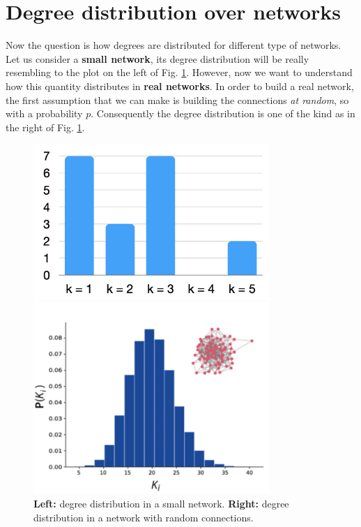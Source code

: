 \documentclass[../main/main.tex]{subfiles}
\begin{document}
\section{Degree distribution over networks}
Now the question is how degrees are distributed for different type of networks.\\
Let us consider a \textbf{small network}, its degree distribution will be really resembling to the plot on the left of Fig. \ref{fig:06_2}. However, now we want to understand how this quantity distributes in \textbf{real networks}. In order to build a real network, the first assumption that we can make is building the connections \textit{at random}, so with a probability $p$. Consequently the degree distribution is one of the kind as in the right of Fig. \ref{fig:06_2}.

\begin{figure}[h!]
\begin{minipage}[c]{0.5\linewidth}
\centering
\includegraphics[width=0.8\textwidth]{../lessons/image/06/2.png}
\end{minipage}
\begin{minipage}[]{0.5\linewidth}
\centering
\includegraphics[width=0.8\textwidth]{../lessons/image/06/3.png}
\end{minipage}
\caption{\label{fig:06_2} \textbf{Left:} degree distribution in a small network. \textbf{Right:} degree distribution in a network with random connections. }
\end{figure}
\end{document}
